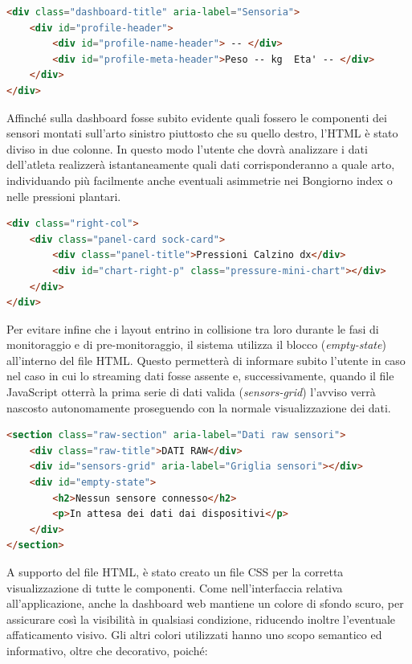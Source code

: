 \documentclass[target=bach,aauheader=,style=]{thud}
\begin{document}
\begin{lstlisting}[language=HTML, caption={Preparazione della dashboard.}, label={html_profile}]
<div class="dashboard-title" aria-label="Sensoria">
    <div id="profile-header">
        <div id="profile-name-header"> -- </div>
        <div id="profile-meta-header">Peso -- kg  Eta' -- </div>
    </div>
</div>
\end{lstlisting}
Affinché sulla dashboard fosse subito evidente quali fossero le componenti dei sensori montati sull'arto sinistro piuttosto che su quello destro, l'HTML è stato diviso in due colonne. In questo modo l'utente che dovrà analizzare i dati dell'atleta realizzerà istantaneamente quali dati corrisponderanno a quale arto, individuando più facilmente anche eventuali asimmetrie nei Bongiorno index o nelle pressioni plantari. \\

\begin{lstlisting}[language=HTML, caption={Struttura di una colonna (destra) in HTML.}, label={html_biomechanics}]
<div class="right-col">
    <div class="panel-card sock-card">
        <div class="panel-title">Pressioni Calzino dx</div>
        <div id="chart-right-p" class="pressure-mini-chart"></div>
    </div>
</div>
\end{lstlisting}
Per evitare infine che i layout entrino in collisione tra loro durante le fasi di monitoraggio e di pre-monitoraggio, il sistema utilizza il blocco (\textit{empty-state}) all'interno del file HTML. Questo permetterà di informare subito l'utente in caso nel caso in cui lo streaming dati fosse assente e, successivamente, quando il file JavaScript otterrà la prima serie di dati valida (\textit{sensors-grid}) l'avviso verrà nascosto autonomamente proseguendo con la normale visualizzazione dei dati. 
\begin{lstlisting}[language=HTML, caption={Visualizzazione dello stato di attesa prima dell'inizio dello streaming.}, label={html_empty_state}]
<section class="raw-section" aria-label="Dati raw sensori">
    <div class="raw-title">DATI RAW</div>
    <div id="sensors-grid" aria-label="Griglia sensori"></div>
    <div id="empty-state">
        <h2>Nessun sensore connesso</h2>
        <p>In attesa dei dati dai dispositivi</p>
    </div>
</section>
\end{lstlisting}
A supporto del file HTML, è stato creato un file CSS per la corretta visualizzazione di tutte le componenti. Come nell'interfaccia relativa all'applicazione, anche la dashboard web mantiene un colore di sfondo scuro, per assicurare così la visibilità in qualsiasi condizione, riducendo inoltre l'eventuale affaticamento visivo. Gli altri colori utilizzati hanno uno scopo semantico ed informativo, oltre che decorativo, poiché:
\end{document}
